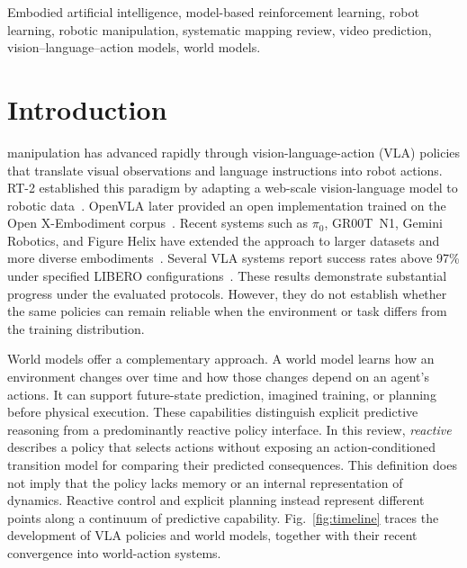 \documentclass{ieeeaccess}
\begin{document}
\begin{IEEEkeywords}
Embodied artificial intelligence, model-based reinforcement learning, robot
learning, robotic manipulation, systematic mapping review, video prediction,
vision--language--action models, world models.
\end{IEEEkeywords}

\maketitle

\section{Introduction}
\label{sec:introduction}

 manipulation has advanced rapidly through vision-language-action (VLA) policies that translate visual observations and language instructions into robot actions. RT-2 established this paradigm by adapting a web-scale vision-language model to robotic data~\cite{rt2}. OpenVLA later provided an open implementation trained on the Open X-Embodiment corpus~\cite{openvla,oxe}. Recent systems such as $\pi_0$, GR00T~N1, Gemini Robotics, and Figure Helix have extended the approach to larger datasets and more diverse embodiments~\cite{pi0,groot,geminirobotics,gemini15}. \textcolor[RGB]{104,48,148}{Several VLA systems report success rates above 97\% under specified LIBERO configurations~\cite{openvlaoft,simplevlarl,cosmospolicy}.} These results demonstrate substantial progress under the evaluated protocols. However, they do not establish whether the same policies can remain reliable when the environment or task differs from the training distribution.

World models offer a complementary approach. A world model learns how an environment changes over time and how those changes depend on an agent's actions. It can support future-state prediction, imagined training, or planning before physical execution. These capabilities distinguish explicit predictive reasoning from a predominantly reactive policy interface. In this review, \emph{reactive} describes a policy that selects actions without exposing an action-conditioned transition model for comparing their predicted consequences. This definition does not imply that the policy lacks memory or an internal representation of dynamics. Reactive control and explicit planning instead represent different points along a continuum of predictive capability. Fig.~\ref{fig:timeline} traces the development of VLA policies and world models, together with their recent convergence into world-action systems.
\end{document}
